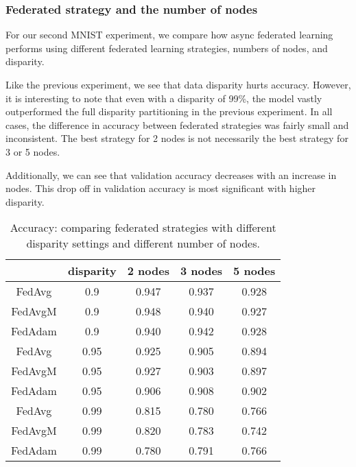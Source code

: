 \documentclass[twocolumn, switch]{article} %
\begin{document}
\subsubsection{Federated strategy and the number of nodes}

For our second MNIST experiment, we compare how async federated learning performs using different federated learning strategies, numbers of nodes, and disparity. 

Like the previous experiment, we see that data disparity hurts accuracy. However, it is interesting to note that even with a disparity of 99\%, the model vastly outperformed the full disparity partitioning in the previous experiment. In all cases, the difference in accuracy between federated strategies was fairly small and inconsistent. The best strategy for 2 nodes is not necessarily the best strategy for 3 or 5 nodes.

Additionally, we can see that validation accuracy decreases with an increase in nodes. This drop off in validation accuracy is most significant with higher disparity.


\begin{table}[H]
\begin{center}

\begin{tabular}{c|c|c|c|c}
     & disparity & 2 nodes & 3 nodes & 5 nodes \\
    \hline
   FedAvg & 0.9 &  0.947 & 0.937 & 0.928 \\
   FedAvgM & 0.9  & 0.948 & 0.940 & 0.927 \\
   FedAdam & 0.9  & 0.940 & 0.942 & 0.928 \\
   \hline
   FedAvg & 0.95 &  0.925 & 0.905 & 0.894 \\
   FedAvgM & 0.95 &  0.927 & 0.903 & 0.897 \\
   FedAdam & 0.95 &  0.906 & 0.908 & 0.902 \\
   \hline
   FedAvg & 0.99 &  0.815 & 0.780 & 0.766 \\
   FedAvgM & 0.99 &  0.820 & 0.783 & 0.742 \\
   FedAdam & 0.99 &  0.780 & 0.791 & 0.766
\end{tabular}
\caption{Accuracy: comparing federated strategies with different disparity settings and different number of nodes.}
\label{tab:mnist1}
\end{center}
\end{table}

\end{document}
